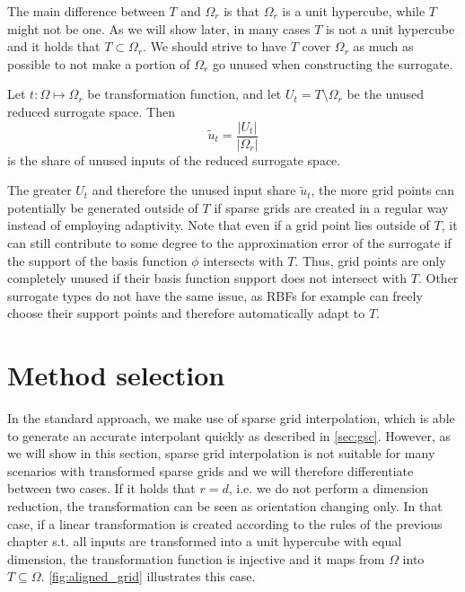 \documentclass[
  a4paper,  %
  twoside,  %
  bibliography=totoc,
  headsepline,
  cleardoublepage=empty,
  parskip=half,
  draft=false
]{scrbook}
\begin{document}
The main difference between $T$ and $\Omega_r$ is that $\Omega_r$ is a unit hypercube, while $T$ might not be one.
As we will show later, in many cases $T$ is not a unit hypercube and it holds that $T \subset \Omega_r$.
We should strive to have $T$ cover $\Omega_r$ as much as possible to not make a portion of $\Omega_r$ go unused when constructing the surrogate.

\begin{definition}
Let $t \colon \Omega \mapsto \Omega_r$ be transformation function, and let $U_t=T \setminus \Omega_r$ be the unused reduced surrogate space.
Then
\begin{equation}
\tilde{u}_t=\frac{|U_t|}{|\Omega_r|}
\end{equation}
is the share of unused inputs of the reduced surrogate space.
\end{definition}

The greater $U_t$ and therefore the unused input share $\tilde{u}_t$, the more grid points can potentially be generated outside of $T$ if sparse grids are created in a regular way instead of employing adaptivity.
Note that even if a grid point lies outside of $T$, it can still contribute to some degree to the approximation error of the surrogate if the support of the basis function $\phi$ intersects with $T$.
Thus, grid points are only completely unused if their basis function support does not intersect with $T$.
Other surrogate types do not have the same issue, as RBFs for example can freely choose their support points and therefore automatically adapt to $T$.


\section{Method selection}

In the standard approach, we make use of sparse grid interpolation, which is able to generate an accurate interpolant quickly as described in \cref{sec:gsc}.
However, as we will show in this section, sparse grid interpolation is not suitable for many scenarios with transformed sparse grids and we will therefore differentiate between two cases.
If it holds that $r=d$, i.e. we do not perform a dimension reduction, the transformation can be seen as orientation changing only.
In that case, if a linear transformation is created according to the rules of the previous chapter s.t. all inputs are transformed into a unit hypercube with equal dimension, the transformation function is injective and it maps from $\Omega$ into $T \subseteq \Omega$.
\cref{fig:aligned_grid} illustrates this case.
\end{document}
